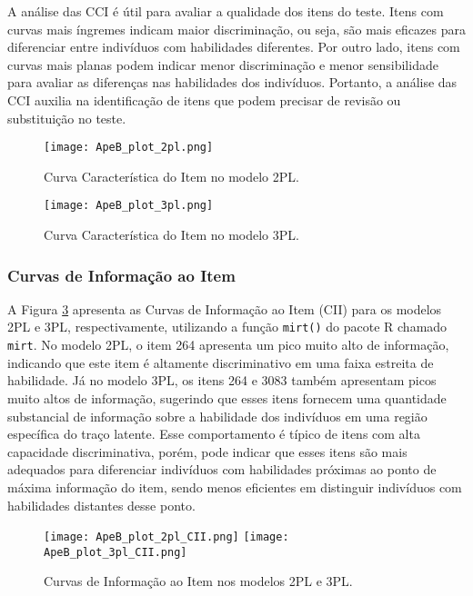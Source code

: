 A análise das CCI é útil para avaliar a qualidade dos itens do teste. Itens com curvas mais íngremes indicam maior discriminação, ou seja, são mais eficazes para diferenciar entre indivíduos com habilidades diferentes. Por outro lado, itens com curvas mais planas podem indicar menor discriminação e menor sensibilidade para avaliar as diferenças nas habilidades dos indivíduos. Portanto, a análise das CCI auxilia na identificação de itens que podem precisar de revisão ou substituição no teste.

\begin{figure}[!ht]
\centering
\texttt{[image: ApeB\_plot\_2pl.png]}
\caption{Curva Característica do Item no modelo 2PL.}
\label{fig:ApeB_plot_2pl}
\end{figure}

\begin{figure}[!ht]
\centering
\texttt{[image: ApeB\_plot\_3pl.png]}
\caption{Curva Característica do Item no modelo 3PL.}
\label{fig:ApeB_plot_3pl}
\end{figure}


\subsubsection{Curvas de Informação ao Item}\label{sec:apeB_cci}

A Figura \ref{fig:ApeB_plot_CII} apresenta as Curvas de Informação ao Item (CII) para os modelos 2PL e 3PL, respectivamente, utilizando a função \verb|mirt()| do pacote R chamado \verb|mirt|. No modelo 2PL, o item 264 apresenta um pico muito alto de informação, indicando que este item é altamente discriminativo em uma faixa estreita de habilidade. Já no modelo 3PL, os itens 264 e 3083 também apresentam picos muito altos de informação, sugerindo que esses itens fornecem uma quantidade substancial de informação sobre a habilidade dos indivíduos em uma região específica do traço latente. Esse comportamento é típico de itens com alta capacidade discriminativa, porém, pode indicar que esses itens são mais adequados para diferenciar indivíduos com habilidades próximas ao ponto de máxima informação do item, sendo menos eficientes em distinguir indivíduos com habilidades distantes desse ponto.

\begin{figure}[!ht]
\centering
\texttt{[image: ApeB\_plot\_2pl\_CII.png]}
\texttt{[image: ApeB\_plot\_3pl\_CII.png]}
\caption{Curvas de Informação ao Item nos modelos 2PL e 3PL.}
\label{fig:ApeB_plot_CII}
\end{figure}

